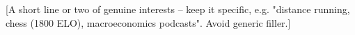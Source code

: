 

\begin{cvparagraph}

[A short line or two of genuine interests -- keep it specific, e.g. "distance running, chess (1800 ELO), macroeconomics podcasts". Avoid generic filler.]

\end{cvparagraph}
